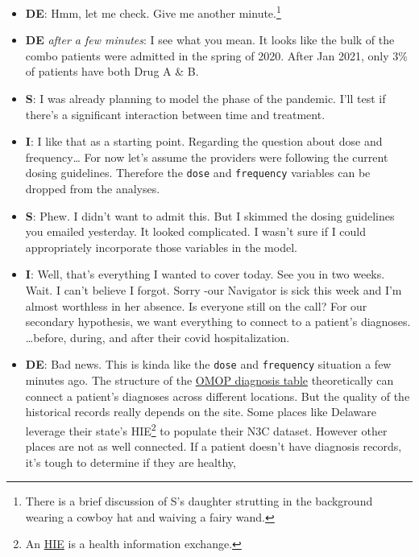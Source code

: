 \documentclass[
  letterpaper,
  DIV=11,
  numbers=noendperiod]{scrreprt}
\begin{document}
\begin{itemize}
  \textbf{SME}: Weird. 8\% is a lot more than I expected. I was thinking
  around 1\%.
\item
  \textbf{DE}: Hmm, let me check. Give me another minute.\footnote{There
    is a brief discussion of S's daughter strutting in the background
    wearing a cowboy hat and waiving a fairy wand.}
\item
  \textbf{DE} \emph{after a few minutes}: I see what you mean. It looks
  like the bulk of the combo patients were admitted in the spring of
  2020. After Jan 2021, only 3\% of patients have both Drug A \& B.
\item
  \textbf{S}: I was already planning to model the phase of the pandemic.
  I'll test if there's a significant interaction between time and
  treatment.
\item
  \textbf{I}: I like that as a starting point. Regarding the question
  about dose and frequency\ldots{} For now let's assume the providers
  were following the current dosing guidelines. Therefore the
  \texttt{dose} and \texttt{frequency} variables can be dropped from the
  analyses.
\item
  \textbf{S}: Phew. I didn't want to admit this. But I skimmed the
  dosing guidelines you emailed yesterday. It looked complicated. I
  wasn't sure if I could appropriately incorporate those variables in
  the model.
\item
  \textbf{I}: Well, that's everything I wanted to cover today. See you
  in two weeks. Wait. I can't believe I forgot. Sorry -our Navigator is
  sick this week and I'm almost worthless in her absence. Is everyone
  still on the call? For our secondary hypothesis, we want everything to
  connect to a patient's diagnoses. \ldots before, during, and after
  their covid hospitalization.
\item
  \textbf{DE}: Bad news. This is kinda like the \texttt{dose} and
  \texttt{frequency} situation a few minutes ago. The structure of the
  \href{https://ohdsi.github.io/CommonDataModel/cdm60.html\#CONDITION_OCCURRENCE}{OMOP
  diagnosis table} theoretically can connect a patient's diagnoses
  across different locations. But the quality of the historical records
  really depends on the site. Some places like Delaware leverage their
  state's HIE\footnote{An
    \href{https://www.healthit.gov/topic/health-it-and-health-information-exchange-basics/health-information-exchange}{HIE}
    is a health information exchange.} to populate their N3C dataset.
  However other places are not as well connected. If a patient doesn't
  have diagnosis records, it's tough to determine if they are healthy,

\end{itemize}
\end{document}

